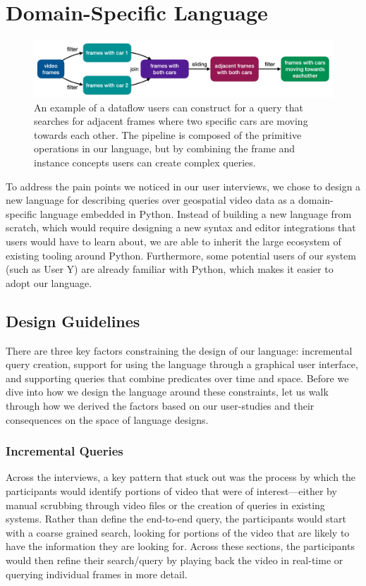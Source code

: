 
\section{Domain-Specific Language}
\begin{figure}[t]
    \centering
    \includegraphics[width=\textwidth]{figures/declarative-dataflow.png}
    \caption{An example of a dataflow users can construct for a query that searches for adjacent frames where two specific cars are moving towards each other. The pipeline is composed of the primitive operations in our language, but by combining the frame and instance concepts users can create complex queries.}
    \label{fig:declarative_dataflow}
\end{figure}

To address the pain points we noticed in our user interviews, we chose to design a new language for describing queries over geospatial video data as a domain-specific language embedded in Python. Instead of building a new language from scratch, which would require designing a new syntax and editor integrations that users would have to learn about, we are able to inherit the large ecosystem of existing tooling around Python. Furthermore, some potential users of our system (such as User Y) are already familiar with Python, which makes it easier to adopt our language.

\subsection{Design Guidelines}
There are three key factors constraining the design of our language: incremental query creation, support for using the language through a graphical user interface, and supporting queries that combine predicates over time and space. Before we dive into how we design the language around these constraints, let us walk through how we derived the factors based on our user-studies and their consequences on the space of language designs.

\subsubsection{Incremental Queries}
Across the interviews, a key pattern that stuck out was the process by which the participants would identify portions of video that were of interest---either by manual scrubbing through video files or the creation of queries in existing systems. Rather than define the end-to-end query, the participants would start with a coarse grained search, looking for portions of the video that are likely to have the information they are looking for. Across these sections, the participants would then refine their search/query by playing back the video in real-time or querying individual frames in more detail.

